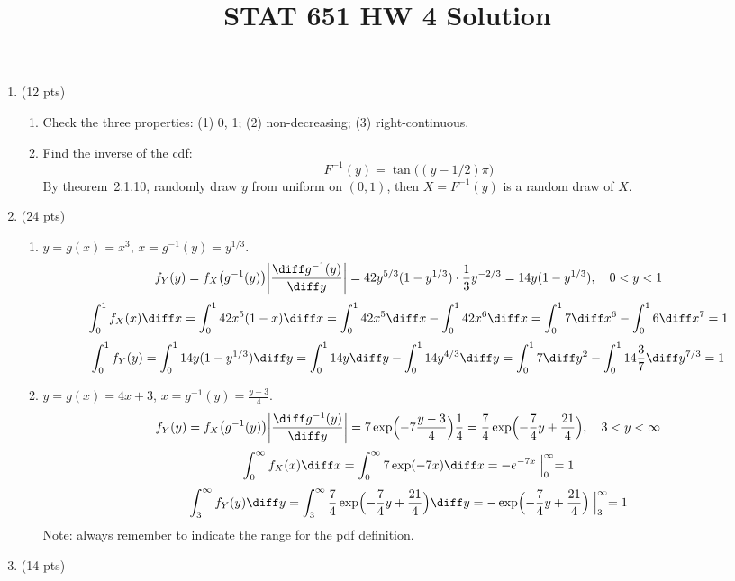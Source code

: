 \documentclass[12pt]{article}
\begin{document}
\title{STAT 651 HW 4 Solution}
\author{}\date{}
\maketitle

\begin{enumerate}
\item (12 pts)

\begin{enumerate}
\item Check the three properties: (1) 0, 1; (2) non-decreasing; (3)
right-continuous.

\item
Find the inverse of the cdf:
\[
F^{-1}(y) = \tan\bigl((y - 1/2)\pi\bigr)
\]
By theorem~2.1.10, randomly draw $y$ from uniform on $(0, 1)$,
then $X = F^{-1}(y)$ is a random draw of $X$.
\end{enumerate}

\item (24 pts)

\begin{enumerate}
\item
$y = g(x) = x^3$, $x = g^{-1}(y) = y^{1/3}$.
\[
f_Y(y)
= f_X\bigl(g^{-1}(y)\bigr)
    \biggl|\frac{\diff g^{-1}(y)}{\diff y}\biggr|
= 42 y^{5/3} (1 - y^{1/3}) \cdot \frac{1}{3} y^{-2/3}
= 14 y(1 - y^{1/3})
,\quad
0 < y < 1
\]
\[
\int_0^1 f_X(x) \diff x
= \int_0^1 42 x^5(1 - x) \diff x
= \int_0^1 42x^5 \diff x - \int_0^1 42 x^6 \diff x
= \int_0^1 7 \diff x^6 - \int_0^1 6 \diff x^7
= 1
\]
\[
\int_0^1 f_Y(y)
= \int_0^1 14y(1 - y^{1/3}) \diff y
= \int_0^1 14y \diff y - \int_0^1 14 y^{4/3} \diff y
= \int_0^1 7\diff y^2 - \int_0^1 14\frac{3}{7} \diff y^{7/3}
= 1
\]

\item
$y = g(x) = 4x + 3$,
$x = g^{-1}(y) = \frac{y-3}{4}$.
\[
f_Y(y)
= f_X\bigl(g^{-1}(y)\bigr) \biggl|\frac{\diff g^{-1}(y)}{\diff y}\biggr|
= 7 \exp\Bigl(-7\frac{y-3}{4}\Bigr) \frac{1}{4}
= \frac{7}{4} \exp\Bigl(-\frac{7}{4}y + \frac{21}{4}\Bigr)
,\quad
3 < y < \infty
\]
\[
\int_0^\infty f_X(x) \diff x
= \int_0^\infty 7\exp(-7x) \diff x
= -e^{-7x}\Bigm|_0^\infty
= 1
\]
\[
\int_3^\infty f_Y(y) \diff y
= \int_3^\infty \frac{7}{4}\exp\Bigl(-\frac{7}{4}y + \frac{21}{4}\Bigr) \diff y
= -\exp\Bigl(-\frac{7}{4}y + \frac{21}{4}\Bigr) \Bigm|_3^\infty
= 1
\]
Note: always remember to indicate the range for the pdf definition.
\end{enumerate}

\item (14 pts)


\end{enumerate}
\end{document}
